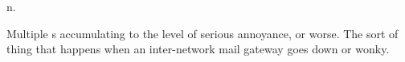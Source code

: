 n.

Multiple s accumulating to the level of serious
annoyance, or worse. The sort of thing that happens when an inter-network mail
gateway goes down or wonky.

